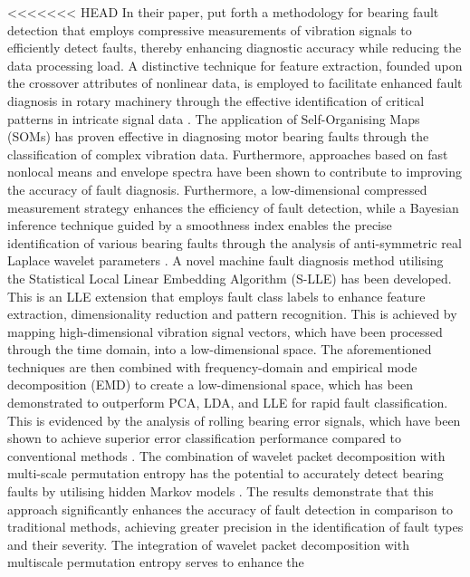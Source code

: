 \documentclass[sn-basic,pdflatex]{sn-jnl}
\theoremstyle{remark}
\theoremstyle{definition}
\begin{document}
<<<<<<< HEAD
In their paper, \citet{WOS:000335959500009} put forth a methodology for
bearing fault detection that employs compressive measurements of
vibration signals to efficiently detect faults, thereby enhancing
diagnostic accuracy while reducing the data processing load. A
distinctive technique for feature extraction, founded upon the crossover
attributes of nonlinear data, is employed to facilitate enhanced fault
diagnosis in rotary machinery through the effective identification of
critical patterns in intricate signal data \citep{WOS:000338603900013}.
The application of Self-Organising Maps (SOMs) has proven effective in
diagnosing motor bearing faults through the classification of complex
vibration data. Furthermore, approaches based on fast nonlocal means and
envelope spectra have been shown to contribute to improving the accuracy
of fault diagnosis. Furthermore, a low-dimensional compressed
measurement strategy enhances the efficiency of fault detection, while a
Bayesian inference technique guided by a smoothness index enables the
precise identification of various bearing faults through the analysis of
anti-symmetric real Laplace wavelet parameters
\citep{WOS:000380543400119, WOS:000348309400067, WOS:000354607100016, WOS:000350998800016}.
A novel machine fault diagnosis method utilising the Statistical Local
Linear Embedding Algorithm (S-LLE) has been developed. This is an LLE
extension that employs fault class labels to enhance feature extraction,
dimensionality reduction and pattern recognition. This is achieved by
mapping high-dimensional vibration signal vectors, which have been
processed through the time domain, into a low-dimensional space. The
aforementioned techniques are then combined with frequency-domain and
empirical mode decomposition (EMD) to create a low-dimensional space,
which has been demonstrated to outperform PCA, LDA, and LLE for rapid
fault classification. This is evidenced by the analysis of rolling
bearing error signals, which have been shown to achieve superior error
classification performance compared to conventional methods
\citep{WOS:000361788200068}. The combination of wavelet packet
decomposition with multi-scale permutation entropy has the potential to
accurately detect bearing faults by utilising hidden Markov models
\citep{WOS:000362513400031}. The results demonstrate that this approach
significantly enhances the accuracy of fault detection in comparison to
traditional methods, achieving greater precision in the identification
of fault types and their severity. The integration of wavelet packet
decomposition with multiscale permutation entropy serves to enhance the
\end{document}
